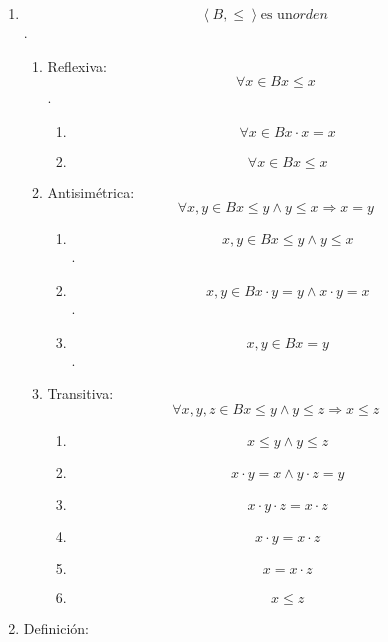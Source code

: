 \begin{enumerate}
\begin{enumerate}
\begin{enumerate}
      \[\forall x,{y \in B}{x \leq y}\Leftrightarrow{{x \cdot y} = x}\Leftrightarrow{{x + y} = y}\]
    \item
      \[\left\langle {B, \leq} \right\rangle\text{es un}\mathit{orden}\].

      \begin{enumerate}
      \def\labelenumiv{\arabic{enumiv}.}
      \item
        Reflexiva: \[\forall{x \in B}{x \leq x}\].

        \begin{enumerate}
        \def\labelenumv{\arabic{enumv}.}
        \tightlist
        \item
          \[\forall{x \in B}{{x \cdot x} = x}\]
        \item
          \[\forall{x \in B}{x \leq x}\]
        \end{enumerate}
      \item
        Antisimétrica:
        \[\forall x,{y \in B}{{x \leq {y \land y}} \leq x}\Rightarrow{x = y}\]

        \begin{enumerate}
        \def\labelenumv{\arabic{enumv}.}
        \tightlist
        \item
          \[x,{y \in B}{{x \leq {y \land y}} \leq x}\].
        \item
          \[x,{y \in B}{{{x \cdot y} = {{y \land x} \cdot y}} = x}\].
        \item
          \[x,{y \in B}{x = y}\].
        \end{enumerate}
      \item
        Transitiva:
        \[\forall x,y,{z \in B}{{x \leq {y \land y}} \leq z}\Rightarrow{x \leq z}\]

        \begin{enumerate}
        \def\labelenumv{\arabic{enumv}.}
        \tightlist
        \item
          \[{x \leq {y \land y}} \leq z\]
        \item
          \[{{x \cdot y} = {{x \land y} \cdot z}} = y\]
        \item
          \[{{x \cdot y} \cdot z} = {x \cdot z}\]
        \item
          \[{x \cdot y} = {x \cdot z}\]
        \item
          \[x = {x \cdot z}\]
        \item
          \[x \leq z\]
        \end{enumerate}
      \end{enumerate}
    \item
      Definición:


\end{enumerate}
\end{enumerate}
\end{enumerate}
